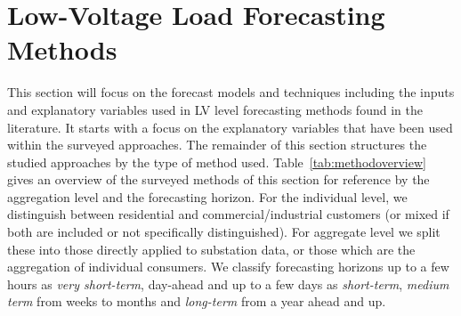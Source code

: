 \section{Low-Voltage Load Forecasting Methods}
\label{sec_forecasting_method_main}

This section will focus on the forecast models and techniques including the inputs and explanatory variables used in LV level forecasting methods found in the literature. It starts with a focus on the explanatory variables that have been used within the surveyed approaches. The remainder of this section structures the studied approaches by the type of method used. Table~\ref{tab:methodoverview} gives an overview of the surveyed methods of this section for reference by the aggregation level and the forecasting horizon. For the individual level, we distinguish between residential and commercial/industrial customers (or mixed if both are included or not specifically distinguished). For aggregate level we split these into those directly applied to substation data, or those which are the aggregation of individual consumers. We classify forecasting horizons up to a few hours as \emph{very short-term}, day-ahead and up to a few days as \emph{short-term}, \emph{medium term} from weeks to months and \emph{long-term} from a year ahead and up.

